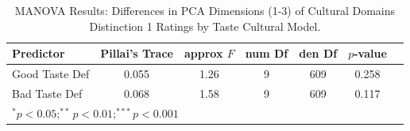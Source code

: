 \begin{table}[htpb]
\centering
\begin{tabular}{lcccccc}
\toprule
Predictor & Pillai's Trace & approx $F$ & num Df & den Df & $p$-value \\
\midrule
Good Taste Def & 0.055 & 1.26 & 9 & 609 & 0.258 \\
Bad Taste Def & 0.068 & 1.58 & 9 & 609 & 0.117 \\
\bottomrule
\multicolumn{6}{l}{\footnotesize $^{*}p<0.05; ^{**}p<0.01; ^{***}p<0.001$} \\
\end{tabular}
\caption{MANOVA Results: Differences in PCA Dimensions (1-3) of Cultural Domains Distinction 1 Ratings by Taste Cultural Model.}
\label{tab:anova_pca_distinction1}
\end{table}

